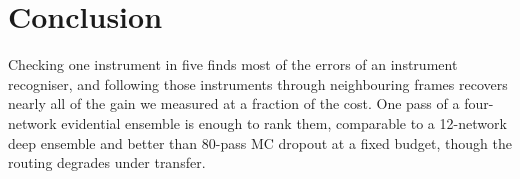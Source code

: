 \section{Conclusion}
\label{sec:conclusion}
Checking one instrument in five finds most of the errors of an instrument recogniser, and following those instruments through neighbouring frames recovers nearly all of the gain we measured at a fraction of the cost.
One pass of a four-network evidential ensemble is enough to rank them, comparable to a 12-network deep ensemble and better than 80-pass MC dropout at a fixed budget, though the routing degrades under transfer.
